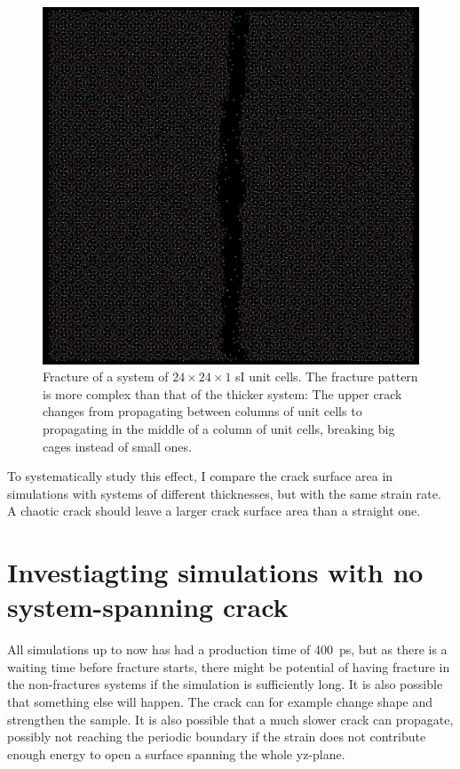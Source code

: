 \begin{figure}
\includegraphics[width=\textwidth]{../pictures/slim_system.pdf}
\caption{Fracture of a system of $24 \times 24 \times 1$ sI unit cells. The fracture pattern is more complex than that of the thicker system: The upper crack changes from propagating between columns of unit cells to propagating in the middle of a column of unit cells, breaking big cages instead of small ones.}
\end{figure}

To systematically study this effect, I compare the crack surface area in simulations with systems of different thicknesses, but with the same strain rate. A chaotic crack should leave a larger crack surface area than a straight one.

\section{Investiagting simulations with no system-spanning crack}
All simulations up to now has had a production time of \SI{400}{\pico\second}, but as there is a waiting time before fracture starts, there might be potential of having fracture in the non-fractures systems if the simulation is sufficiently long. It is also possible that something else will happen. The crack can for example change shape and strengthen the sample. It is also possible that a much slower crack can propagate, possibly not reaching the periodic boundary if the strain does not contribute enough energy to open a surface spanning the whole yz-plane. 

